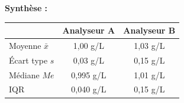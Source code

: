 \documentclass[11pt,a4paper]{article}
\begin{document}
\begin{exemple}
\vspace{0.3cm}
\textbf{Synthèse :}

\begin{center}
\begin{tabular}{|l|c|c|}
\hline
& \textbf{Analyseur A} & \textbf{Analyseur B} \\
\hline
Moyenne $\bar{x}$ & 1,00 g/L & 1,03 g/L \\
\hline
Écart type $s$ & 0,03 g/L & 0,15 g/L \\
\hline
Médiane $Me$ & 0,995 g/L & 1,01 g/L \\
\hline
IQR & 0,040 g/L & 0,15 g/L \\
\hline
\end{tabular}
\end{center}
\end{exemple}
\end{document}

